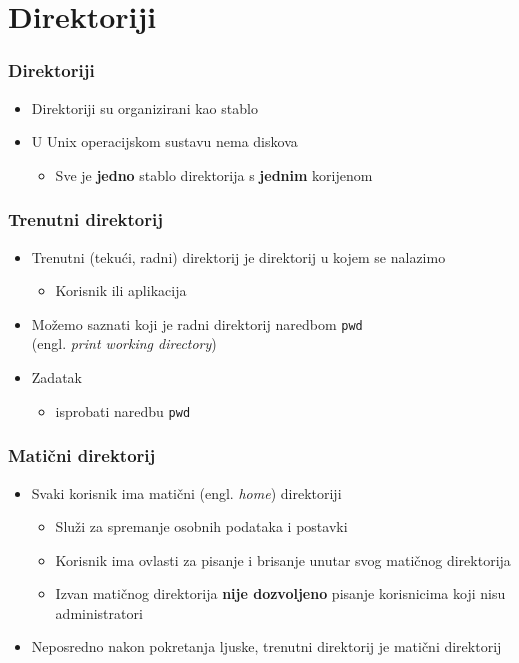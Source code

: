 \documentclass{beamer}
\begin{document}
\section{Direktoriji}
\begin{frame}[t]
\frametitle{Direktoriji}
\begin{itemize}
  \item Direktoriji su organizirani kao stablo
  \item U Unix operacijskom sustavu nema diskova
  \begin{itemize}
    \item Sve je \textbf{jedno} stablo direktorija s \textbf{jednim} 
          korijenom
  \end{itemize}
  \centering
\end{itemize}
\end{frame} 


\begin{frame}[t]
\frametitle{Trenutni direktorij}
\begin{itemize}
  \item Trenutni (tekući, radni) direktorij je direktorij u kojem se
        nalazimo
  \begin{itemize}
    \item Korisnik ili aplikacija
  \end{itemize}
  \item Možemo saznati koji je radni direktorij naredbom \texttt{pwd} 
        \\(engl. \emph{print working directory})
  \item Zadatak
  \begin{itemize}
    \item isprobati naredbu \texttt{pwd}
  \end{itemize}
\end{itemize}
\end{frame}

\begin{frame}[t]
\frametitle{Matični direktorij}
\begin{itemize}
  \item Svaki korisnik ima matični (engl. \emph{home}) direktoriji
  \begin{itemize}
    \item Služi za spremanje osobnih podataka i postavki
    \item Korisnik ima ovlasti za pisanje i brisanje unutar svog matičnog
          direktorija
    \item Izvan matičnog direktorija \textbf{nije dozvoljeno} pisanje 
          korisnicima koji nisu administratori
  \end{itemize}
  \item Neposredno nakon pokretanja ljuske, trenutni direktorij je matični
        direktorij 
\end{itemize}
\end{frame}
\end{document}
